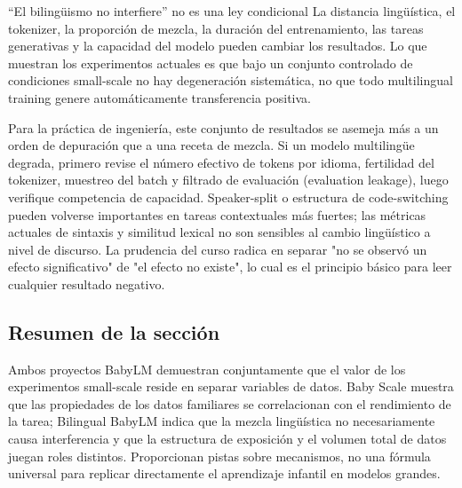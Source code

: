 \begin{warningbox}{“El bilingüismo no interfiere” no es una ley condicional}
La distancia lingüística, el tokenizer, la proporción de mezcla, la duración del entrenamiento, las tareas generativas y la capacidad del modelo pueden cambiar los resultados. Lo que muestran los experimentos actuales es que bajo un conjunto controlado de condiciones small-scale no hay degeneración sistemática, no que todo multilingual training genere automáticamente transferencia positiva.
\end{warningbox}

Para la práctica de ingeniería, este conjunto de resultados se asemeja más a un orden de depuración que a una receta de mezcla. Si un modelo multilingüe degrada, primero revise el número efectivo de tokens por idioma, fertilidad del tokenizer, muestreo del batch y filtrado de evaluación (evaluation leakage), luego verifique competencia de capacidad. Speaker-split o estructura de code-switching pueden volverse importantes en tareas contextuales más fuertes; las métricas actuales de sintaxis y similitud lexical no son sensibles al cambio lingüístico a nivel de discurso. La prudencia del curso radica en separar "no se observó un efecto significativo" de "el efecto no existe", lo cual es el principio básico para leer cualquier resultado negativo.

\subsection{Resumen de la sección}

Ambos proyectos BabyLM demuestran conjuntamente que el valor de los experimentos small-scale reside en separar variables de datos. Baby Scale muestra que las propiedades de los datos familiares se correlacionan con el rendimiento de la tarea; Bilingual BabyLM indica que la mezcla lingüística no necesariamente causa interferencia y que la estructura de exposición y el volumen total de datos juegan roles distintos. Proporcionan pistas sobre mecanismos, no una fórmula universal para replicar directamente el aprendizaje infantil en modelos grandes.
